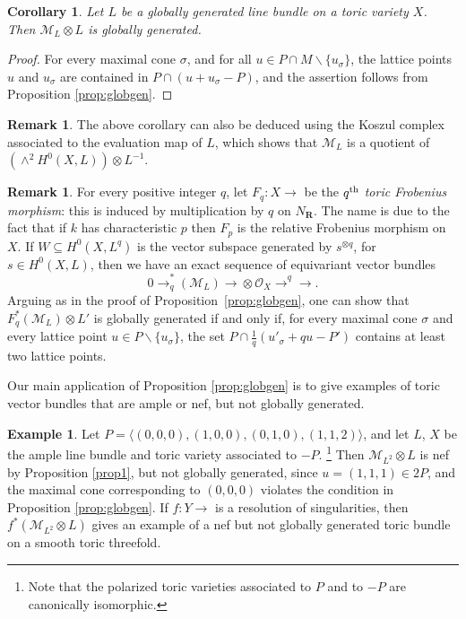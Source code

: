 \documentclass[12pt]{amsart}
\newtheorem{corollary}[lemma]{Corollary}
\theoremstyle{definition}
\newtheorem{remark}[lemma]{Remark}
\newtheorem{example}[lemma]{Example}
\theoremstyle{remark}
\begin{document}
\begin{corollary} Let $L$ be a globally generated line bundle on a toric 
variety $X$. Then ${\mathcal{M}}_{L}\otimes L$ is globally generated. 
\end{corollary}
 
\begin{proof} For every maximal cone $\sigma$, and for all $u\in P\cap M 
\smallsetminus  \{u_{\sigma}\}$, the lattice points $u$ and $u_{\sigma}$ 
are contained in $P\cap 
\left(u+u_{\sigma}-P\right)$, and the assertion follows from 
 Proposition \ref{prop:globgen}.
\end{proof}

\begin{remark}\label{rem5}
The above corollary can also be deduced using the
Koszul complex associated to the evaluation map of $L$, which shows that ${\mathcal{M}}_L$
is a quotient of $\left(\wedge^2H^0(X,L)\right)\otimes L^{-1}$.
\end{remark}

\begin{remark}\label{rem:Frob} For every positive integer $q$, let $F_q\colon X{\xrightarrow{\ \ }}$
be the $q^{\rm th}$ \emph{toric Frobenius morphism}: this is induced by 
 multiplication by $q$ on $N_{{\mathbf R}}$. 
The name is due to the fact that if $k$ has characteristic $p$ then $F_p$ is the relative Frobenius morphism on $X$. If $W\subseteq H^0(X,L^q)$ is the vector subspace generated by $s^{\otimes q}$, for
$s\in H^0(X,L)$, then we have an exact sequence of equivariant vector bundles
$$0{\xrightarrow{\ \ }}_q^*({\mathcal{M}}_L){\xrightarrow{\ \ }}\otimes{\mathcal{O}}_X{\xrightarrow{\ \ }}^q{\xrightarrow{\ \ }}.$$
 Arguing as in the proof of Proposition~\ref{prop:globgen},
 one can show that $F_q^*({\mathcal{M}}_L)\otimes L'$ is globally generated if 
 and only if, for every maximal cone $\sigma$ and 
 every lattice point $u\in P\smallsetminus\{u_{\sigma}\}$, the
 set $P\cap\frac{1}{q}(u'_{\sigma}+qu-P')$ contains at least two lattice points.
\end{remark}

Our main application of Proposition \ref{prop:globgen} is to give
examples of toric vector bundles that are ample or nef, but not globally 
generated. 

\begin{example}\label{example11}
 Let $P = {\langle} (0,0,0), (1,0,0), (0,1,0), (1,1,2){\rangle}$, and let 
 $L$, $X$ be the ample line bundle and toric variety associated to $-P$.
 \footnote{Note that the polarized toric varieties associated to $P$ and to $-P$
 are canonically isomorphic.} 
 Then ${\mathcal{M}}_{L^2}\otimes L$ is nef by Proposition 
\ref{prop1}, but not globally generated, since 
$u = (1,1,1) \in 2P$, and the maximal cone corresponding to $(0,0,0)$ 
violates the condition in Proposition \ref{prop:globgen}.
If  $f\colon Y{\xrightarrow{\ \ }}$ is a resolution of singularities, then 
$f^*({\mathcal{M}}_{L^2}\otimes L)$ gives an example of a nef 
but not globally generated toric bundle on a smooth toric threefold.
\end{example}
\end{document}
